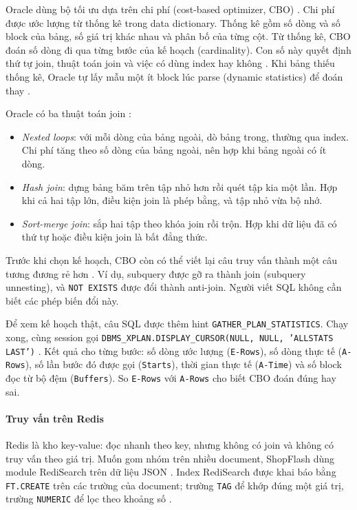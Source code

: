 Oracle dùng bộ tối ưu dựa trên chi phí (cost-based optimizer, CBO) \cite{qOracleOptimizer}. Chi phí được ước lượng từ thống kê trong data dictionary. Thống kê gồm số dòng và số block của bảng, số giá trị khác nhau và phân bố của từng cột. Từ thống kê, CBO đoán số dòng đi qua từng bước của kế hoạch (cardinality). Con số này quyết định thứ tự join, thuật toán join và việc có dùng index hay không \cite{qOracleStatsConcepts}. Khi bảng thiếu thống kê, Oracle tự lấy mẫu một ít block lúc parse (dynamic statistics) để đoán thay \cite{qOracleStatsConcepts}.

Oracle có ba thuật toán join \cite{qOracleJoins}:

\begin{itemize}[leftmargin=*,itemsep=2pt,topsep=4pt]
\item \textit{Nested loops}: với mỗi dòng của bảng ngoài, dò bảng trong, thường qua index. Chi phí tăng theo số dòng của bảng ngoài, nên hợp khi bảng ngoài có ít dòng.
\item \textit{Hash join}: dựng bảng băm trên tập nhỏ hơn rồi quét tập kia một lần. Hợp khi cả hai tập lớn, điều kiện join là phép bằng, và tập nhỏ vừa bộ nhớ.
\item \textit{Sort-merge join}: sắp hai tập theo khóa join rồi trộn. Hợp khi dữ liệu đã có thứ tự hoặc điều kiện join là bất đẳng thức.
\end{itemize}

Trước khi chọn kế hoạch, CBO còn có thể viết lại câu truy vấn thành một câu tương đương rẻ hơn \cite{qOracleTransform}. Ví dụ, subquery được gỡ ra thành join (subquery unnesting), và \texttt{NOT EXISTS} được đổi thành anti-join. Người viết SQL không cần biết các phép biến đổi này.

Để xem kế hoạch thật, câu SQL được thêm hint \texttt{GATHER\_PLAN\_STATISTICS}. Chạy xong, cùng session gọi \texttt{DBMS\_XPLAN.DISPLAY\_CURSOR(NULL, NULL, 'ALLSTATS LAST')} \cite{qOracleXplan}. Kết quả cho từng bước: số dòng ước lượng (\texttt{E-Rows}), số dòng thực tế (\texttt{A-Rows}), số lần bước đó được gọi (\texttt{Starts}), thời gian thực tế (\texttt{A-Time}) và số block đọc từ bộ đệm (\texttt{Buffers}). So \texttt{E-Rows} với \texttt{A-Rows} cho biết CBO đoán đúng hay sai.

\paragraph{Truy vấn trên Redis}\label{sec:q-theory-redis}

Redis là kho key-value: đọc nhanh theo key, nhưng không có join và không có truy vấn theo giá trị. Muốn gom nhóm trên nhiều document, ShopFlash dùng module RediSearch trên dữ liệu JSON \cite{redisJsonIndexing}. Index RediSearch được khai báo bằng \texttt{FT.CREATE} trên các trường của document; trường \texttt{TAG} để khớp đúng một giá trị, trường \texttt{NUMERIC} để lọc theo khoảng số \cite{redisFtCreate}.

